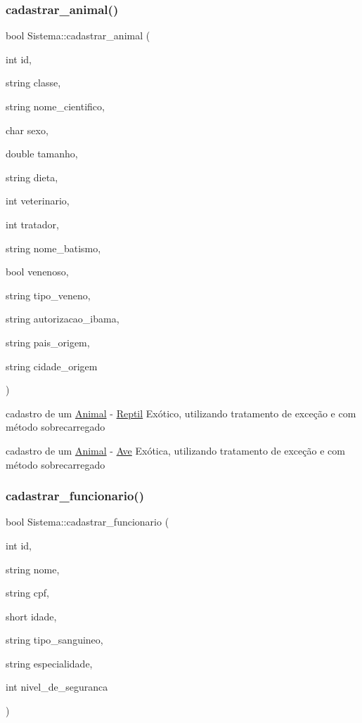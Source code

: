 \subsubsection{\texorpdfstring{cadastrar\_animal()}{cadastrar\_animal()}\hspace{0.1cm}{\footnotesize\ttfamily [12/12]}}
{\footnotesize\ttfamily bool Sistema\+::cadastrar\+\_\+animal (\begin{DoxyParamCaption}\item[{int}]{id,  }\item[{string}]{classe,  }\item[{string}]{nome\+\_\+cientifico,  }\item[{char}]{sexo,  }\item[{double}]{tamanho,  }\item[{string}]{dieta,  }\item[{int}]{veterinario,  }\item[{int}]{tratador,  }\item[{string}]{nome\+\_\+batismo,  }\item[{bool}]{venenoso,  }\item[{string}]{tipo\+\_\+veneno,  }\item[{string}]{autorizacao\+\_\+ibama,  }\item[{string}]{pais\+\_\+origem,  }\item[{string}]{cidade\+\_\+origem }\end{DoxyParamCaption})}



cadastro de um \mbox{\hyperlink{class_animal}{Animal}} -\/ \mbox{\hyperlink{class_reptil}{Reptil}} Exótico, utilizando tratamento de exceção e com método sobrecarregado 

cadastro de um \mbox{\hyperlink{class_animal}{Animal}} -\/ \mbox{\hyperlink{class_ave}{Ave}} Exótica, utilizando tratamento de exceção e com método sobrecarregado \mbox{\label{class_sistema_aabbe1927854b5a8b17a98b6cabdb7ff3}} 
\subsubsection{\texorpdfstring{cadastrar\_funcionario()}{cadastrar\_funcionario()}\hspace{0.1cm}{\footnotesize\ttfamily [1/2]}}
{\footnotesize\ttfamily bool Sistema\+::cadastrar\+\_\+funcionario (\begin{DoxyParamCaption}\item[{int}]{id,  }\item[{string}]{nome,  }\item[{string}]{cpf,  }\item[{short}]{idade,  }\item[{string}]{tipo\+\_\+sanguineo,  }\item[{string}]{especialidade,  }\item[{int}]{nivel\+\_\+de\+\_\+seguranca }\end{DoxyParamCaption})}



